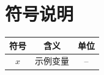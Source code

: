 \section{符号说明}
\begin{table}[H]
\centering
\begin{tabular}{ccc}
\toprule
符号 & 含义 & 单位\\
\midrule
$x$ & 示例变量 & --\\
\bottomrule
\end{tabular}
\end{table}
